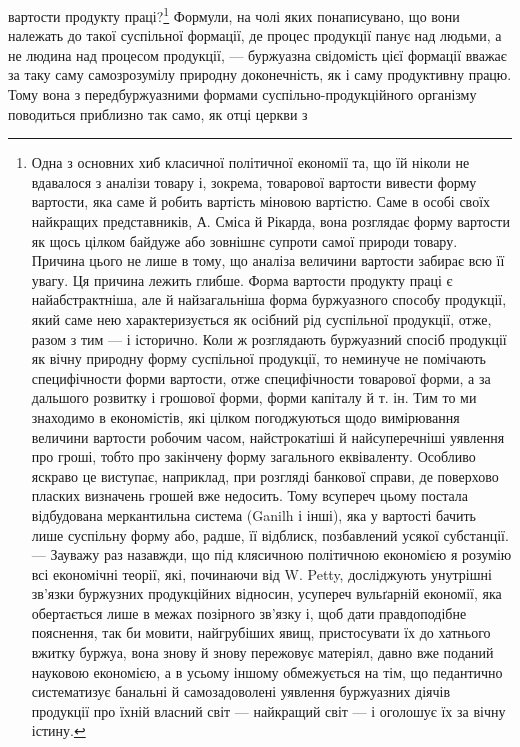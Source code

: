 \parcont{}  %
вартости продукту праці?\footnote{
Одна з основних хиб класичної політичної економії та, що їй ніколи
не вдавалося з аналізи товару і, зокрема, товарової вартости вивести
форму вартости, яка саме й робить вартість міновою вартістю. Саме в особі
своїх найкращих представників, А. Сміса й Рікарда, вона розглядає форму
вартости як щось цілком байдуже або зовнішнє супроти самої природи
товару. Причина цього не лише в тому, що аналіза величини вартости
забирає всю її увагу. Ця причина лежить глибше. Форма вартости продукту
праці є найабстрактніша, але й найзагальніша форма буржуазного
способу продукції, який саме нею характеризується як осібний рід суспільної
продукції, отже, разом з тим — і історично. Коли ж розглядають
буржуазний спосіб продукції як вічну природну форму суспільної продукції,
то неминуче не помічають специфічности форми вартости, отже
специфічности товарової форми, а за дальшого розвитку і грошової форми,
форми капіталу й т. ін. Тим то ми знаходимо в економістів, які цілком
погоджуються щодо вимірювання величини вартости робочим часом, найстрокатіші
й найсуперечніші уявлення про гроші, тобто про закінчену
форму загального еквіваленту. Особливо яскраво це виступає, наприклад,
при розгляді банкової справи, де поверхово пласких визначень грошей
вже недосить. Тому всупереч цьому постала відбудована меркантильна
система (Ganilh і інші), яка у вартості бачить лише суспільну форму
або, радше, її відблиск, позбавлений усякої субстанції. — Зауважу раз
назавжди, що під клясичною політичною економією я розумію всі економічні
теорії, які, починаючи від W. Petty, досліджують унутрішні зв’язки
буржузних продукційних відносин, усупереч вульґарній економії, яка
обертається лише в межах позірного зв’язку і, щоб дати правдоподібне
пояснення, так би мовити, найгрубіших явищ, пристосувати їх до хатнього
вжитку буржуа, вона знову й знову пережовує матеріял, давно вже поданий
науковою економією, а в усьому іншому обмежується на тім, що
педантично систематизує банальні й самозадоволені уявлення буржуазних
діячів продукції про їхній власний світ — найкращий світ — і оголошує
їх за вічну істину.
} Формули, на чолі яких понаписувано,
що вони належать до такої суспільної формації, де процес продукції
панує над людьми, а не людина над процесом продукції, —
буржуазна свідомість цієї формації вважає за таку саму самозрозумілу
природну доконечність, як і саму продуктивну працю.
Тому вона з передбуржуазними формами суспільно-продукційного
організму поводиться приблизно так само, як отці церкви з
